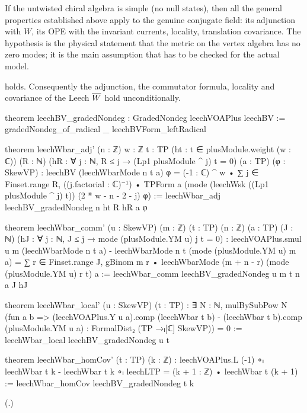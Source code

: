 \begin{physics}
If the untwisted chiral algebra is simple (no null states), then all the general properties established above apply to the genuine conjugate field: its adjunction with $W$, its OPE with the invariant currents, locality, translation covariance. The hypothesis is the physical statement that the metric on the vertex algebra has no zero modes; it is the main assumption that has to be checked for the actual model.
\end{physics}

\begin{theorem}\label{ch09:thm:hnd}
 holds. Consequently the adjunction, the commutator formula, locality and covariance of
the Leech $\overline{W}$ hold unconditionally.
\end{theorem}
\begin{leancode}
theorem leechBV_gradedNondeg : GradedNondeg leechVOAPlus leechBV :=
  gradedNondeg_of_radical _ leechBVForm_leftRadical

theorem leechWbar_adj' (n : ℤ) {w : ℤ} {t : TP} (ht : t ∈ plusModule.weight (w : ℂ)) (R : ℕ)
    (hR : ∀ j : ℕ, R ≤ j → (Lp1 plusModule ^ j) t = 0) (a : TP) (φ : SkewVP) :
    leechBV (leechWbarMode n t a) φ = (-1 : ℂ) ^ w • ∑ j ∈ Finset.range R,
      ((j.factorial : ℂ)⁻¹) • TPForm a (mode (leechWsk ((Lp1 plusModule ^ j) t))
        (2 * w - n - 2 - j) φ) :=
  leechWbar_adj leechBV_gradedNondeg n ht R hR a φ

theorem leechWbar_comm' (u : SkewVP) (m : ℤ) (t : TP) (n : ℤ) (a : TP) (J : ℕ)
    (hJ : ∀ j : ℕ, J ≤ j → mode (plusModule.YM u) j t = 0) :
    leechVOAPlus.smul u m (leechWbarMode n t a) - leechWbarMode n t (mode (plusModule.YM u) m a)
      = ∑ r ∈ Finset.range J,
          gBinom m r • leechWbarMode (m + n - r) (mode (plusModule.YM u) r t) a :=
  leechWbar_comm leechBV_gradedNondeg u m t n a J hJ

theorem leechWbar_local' (u : SkewVP) (t : TP) :
    ∃ N : ℕ, mulBySubPow N
      (fun a b => (leechVOAPlus.Y u a).comp (leechWbar t b)
        - (leechWbar t b).comp (plusModule.YM u a) : FormalDist₂ (TP →ₗ[ℂ] SkewVP)) = 0 :=
  leechWbar_local leechBV_gradedNondeg u t

theorem leechWbar_homCov' (t : TP) (k : ℤ) :
    leechVOAPlus.L (-1) ∘ₗ leechWbar t k - leechWbar t k ∘ₗ leechLTP
      = (k + 1 : ℤ) • leechWbar t (k + 1) :=
  leechWbar_homCov leechBV_gradedNondeg t k
\end{leancode}
(.)
